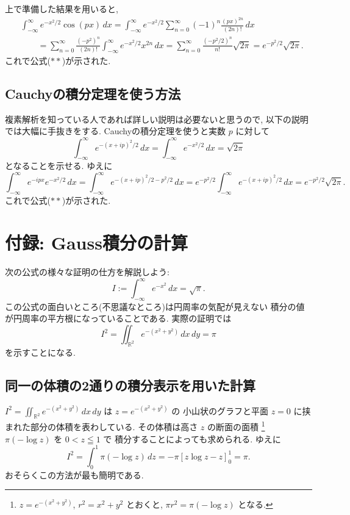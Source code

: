 \documentclass[12pt,twoside]{jarticle}
\newcommand\R{{\mathbb R}} %
\theoremstyle{jplain}
\theoremstyle{jplain}
\theoremstyle{jplain}
\numberwithin{theorem}{section}
\numberwithin{equation}{section}
\numberwithin{figure}{section}
\numberwithin{table}{section}
\begin{document}
上で準備した結果を用いると,
\begin{align*}
&
\int_{-\infty}^\infty e^{-x^2/2}\cos(px)\,dx
=
\int_{-\infty}^\infty e^{-x^2/2}
\sum_{n=0}^\infty (-1)^n\frac{(px)^{2n}}{(2n)!}
\,dx
\\ & \qquad
=
\sum_{n=0}^\infty \frac{(-p^2)^n}{(2n)!}
\int_{-\infty}^\infty e^{-x^2/2}x^{2n}\,dx
=
\sum_{n=0}^\infty \frac{(-p^2/2)^n}{n!}\sqrt{2\pi}
=
e^{-p^2/2}\sqrt{2\pi}.
\end{align*}
これで公式($**$)が示された.


\subsection{Cauchyの積分定理を使う方法}

複素解析を知っている人であれば詳しい説明は必要ないと思うので,
以下の説明では大幅に手抜きをする.
Cauchyの積分定理を使うと実数 $p$ に対して
\[
\int_{-\infty}^\infty e^{-(x+ip)^2/2}\,dx
=\int_{-\infty}^\infty e^{-x^2/2}\,dx
=\sqrt{2\pi}
\]
となることを示せる. ゆえに
\[
\int_{-\infty}^\infty e^{-ipx}e^{-x^2/2}\,dx
=
\int_{-\infty}^\infty e^{-(x+ip)^2/2-p^2/2}\,dx
=
e^{-p^2/2}\int_{-\infty}^\infty e^{-(x+ip)^2/2}\,dx
=
e^{-p^2/2}\sqrt{2\pi}.
\]
これで公式($**$)が示された.


\section{付録: Gauss積分の計算}

次の公式の様々な証明の仕方を解説しよう:
\[
 I:=\int_{-\infty}^\infty e^{-x^2}\,dx = \sqrt{\pi}.
\]
この公式の面白いところ(不思議なところ)は円周率の気配が見えない
積分の値が円周率の平方根になっていることである.
実際の証明では
\[
 I^2 = \iint_{\R^2} e^{-(x^2+y^2)}\,dx\,dy = \pi
\]
を示すことになる.


\subsection{同一の体積の2通りの積分表示を用いた計算}

$I^2=\iint_{\R^2}e^{-(x^2+y^2)}\,dx\,dy$ は $z=e^{-(x^2+y^2)}$ の
小山状のグラフと平面 $z=0$ に挟まれた部分の体積を表わしている.
その体積は高さ $z$ の断面の面積%
\footnote{$z=e^{-(x^2+y^2)}$, $r^2=x^2+y^2$ とおくと,
$\pi r^2=\pi(-\log z)$ となる.} %
$\pi(-\log z)$ を $0<z\leqq 1$ で
積分することによっても求められる.  ゆえに
\[
I^2=\int_0^1 \pi(-\log z)\,dz = -\pi[z\log z-z]_0^1 = \pi.
\]
おそらくこの方法が最も簡明である.
\end{document}
